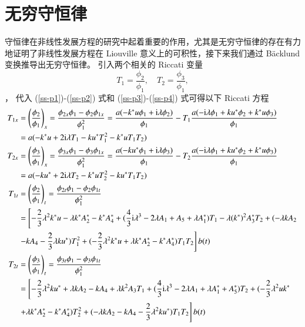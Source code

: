 \section{无穷守恒律}
守恒律在非线性发展方程的研究中起着重要的作用，尤其是无穷守恒律的存在有力地证明了非线性发展方程在 Liouville 意义上的可积性，接下来我们通过 B\"{a}cklund 变换推导出无穷守恒律。
引入两个相关的 Riccati 变量 
\begin{equation}
  T_{1} = \frac{\phi_{2}}{\phi_{1}}, \quad T_{2} = \frac{\phi_{3}}{\phi_{1}},
\end{equation}，
代入 (\ref{ss-p1})-(\ref{ss-p2}) 式和 (\ref{ss-p3})-(\ref{ss-p4}) 式可得以下 Riccati 方程
\begin{align}
  T_{1x} &= \left(\frac{\phi_2}{\phi_1}\right)_x=\frac{\phi_{2x}\phi_1-\phi_2\phi_{1x}}{\phi_1^2}=\frac{a(-k^*u\phi_1+\mathrm{i}\lambda\phi_2)}{\phi_1}-T_1\frac{a(-\mathrm{i}\lambda\phi_1+ku^*\phi_2+k^*u\phi_3)}{\phi_1}\nonumber\\
  &= a(-k^{*}u + 2\mathrm{i}\lambda T_{1} - ku^{*}T_{1}^{2} - k^{*}uT_{1}T_{2}) \label{ss-t1x} \\
  T_{2x} &=\left(\frac{\phi_3}{\phi_1}\right)_x=\frac{\phi_{3x}\phi_1-\phi_3\phi_{1x}}{\phi_1^2}=\frac{a(-ku^*\phi_1+\mathrm{i}\lambda\phi_3)}{\phi_1}-T_2\frac{a(-\mathrm{i}\lambda\phi_1+ku^*\phi_2+k^*u\phi_3)}{\phi_1}\nonumber\\
  &= a(-ku^{*} + 2\mathrm{i}\lambda T_{2} - k^{*}uT_{2}^{2} - ku^{*}T_{1}T_{2}) \label{ss-t2x} \\
  T_{1t} &=\left(\frac{\phi_2}{\phi_1}\right)_t=\frac{\phi_{2t}\phi_1-\phi_2\phi_{1t}}{\phi_1^2}\nonumber\\ 
  &= \left[-\frac{2}{3}\lambda^{2}k^{*}u - \lambda k^{*}A_{2}^{*} - k^{*}A_{4}^{*} + (\frac{4}{3}\mathrm{i}\lambda^{3}-2\lambda A_{1}+A_{5}+\lambda A_{1}^{*})T_{1} - \lambda (k^{*})^{2}A_{3}^{*}T_{2} + (-\lambda kA_{2} \right.\notag\\
  & \left. - kA_{4} - \frac{2}{3}\lambda ku^{*})T_{1}^{2} + (-\frac{2}{3}\lambda^{2}k^{*}u+\lambda k^{*}A_{2}^{*}-k^{*}A_{4}^{*})T_{1}T_{2} \right]b(t) \\
  T_{2t} &=\left(\frac{\phi_3}{\phi_1}\right)_t=\frac{\phi_{3t}\phi_1-\phi_3\phi_{1t}}{\phi_1^2}\nonumber\\ 
  &= \left[-\frac{2}{3}\lambda^{2}ku^{*} + \lambda kA_{2} - kA_{4} + \lambda k^{2}A_{3}T_{1} + (\frac{4}{3}\mathrm{i}\lambda^{3}-2\lambda A_{1}+\lambda A_{1}^{*}+A_{5}^{*})T_{2} + (-\frac{2}{3}\lambda^{2}uk^{*} \right. \notag\\
  & \left. +\lambda k^{*}A_{2}^{*}-k^{*}A_{4}^{*})T_{2}^{2} + (-\lambda kA_{2}-kA_{4}-\frac{2}{3}\lambda^{2}ku^{*})T_{1}T_{2} \right]b(t)
\end{align}

